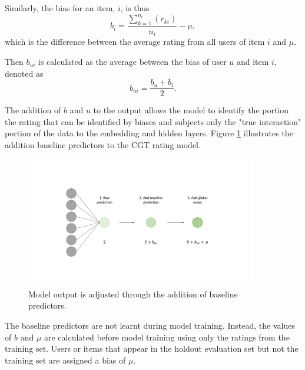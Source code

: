 Similarly, the bias for an item, $i$, is thus
\begin{equation}
    b_{i} = \dfrac{\sum_{k=1}^{n_i} (r_{ki})}{n_i} - \mu,
\label{eqn:CGT-item-bias}
\end{equation}
which is the difference between the average rating from all users of item $i$ and $\mu$.

Then $b_{ui}$ is calculated as the average between the bias of user $u$ and item $i$, denoted as
\begin{equation}
    b_{ui} = \dfrac{b_u + b_i}{2}.
\label{eqn:CGT-baseline}
\end{equation}

The addition of $b$ and $u$ to the output allows the model to identify the portion the rating that can be identified by biases and subjects only the "true interaction" portion of the data to the embedding and hidden layers. Figure \ref{fig:4_CGT-rating-layer} illustrates the addition baseline predictors to the CGT rating model.

\begin{figure}[H]
\centering
\includegraphics[width=0.9\textwidth]{Figures/4_CGT-output-layer.pdf}
\decoRule
\caption[Rating layer]{Model output is adjusted through the addition of baseline predictors.}
\label{fig:4_CGT-rating-layer}
\end{figure}

The baseline predictors are not learnt during model training. Instead, the values of $b$ and $\mu$ are calculated before model training using only the ratings from the training set. Users or items that appear in the holdout evaluation set but not the training set are assigned a bias of $\mu$.

